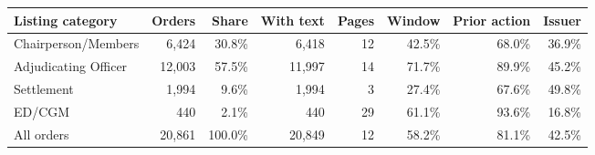 \begin{tabular*}{\textwidth}[]{l@{\extracolsep\fill}rrrrrrr}
\toprule
Listing category & Orders & Share & With text & Pages & Window & Prior action & Issuer\\
\midrule
Chairperson/Members & 6,424 & 30.8\% & 6,418 & 12 & 42.5\% & 68.0\% & 36.9\%\\
Adjudicating Officer & 12,003 & 57.5\% & 11,997 & 14 & 71.7\% & 89.9\% & 45.2\%\\
Settlement & 1,994 & 9.6\% & 1,994 & 3 & 27.4\% & 67.6\% & 49.8\%\\
ED/CGM & 440 & 2.1\% & 440 & 29 & 61.1\% & 93.6\% & 16.8\%\\
All orders & 20,861 & 100.0\% & 20,849 & 12 & 58.2\% & 81.1\% & 42.5\%\\
\bottomrule
\end{tabular*}
